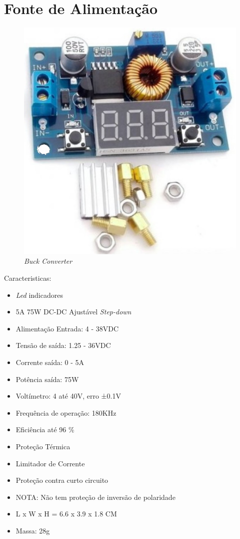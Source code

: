 \section{Fonte de Alimentação}
\begin{minipage}[!b]{.5\linewidth}
	\begin{figure}[H]
		\captionsetup{justification=raggedright,singlelinecheck=false}
		\flushleft
		\includegraphics[scale=0.5]{./image/PESTA/material/DCDC_converter.jpg}
		\caption{\textit{Buck Converter}}
		\label{buck-converter}
	\end{figure}
\end{minipage}
\begin{minipage}[!b]{.5\linewidth}
\small
Caracteristicas:
	\begin{itemize}
		\setlength\itemsep{-0.5em}
		\footnotesize
		\item \textit{Led} indicadores
		\item 5A 75W DC-DC Ajustável \textit{Step-down}
		\item Alimentação Entrada: 4 - 38VDC
		\item Tensão de saída: 1.25 - 36VDC
		\item Corrente saída: 0 - 5A
		\item Potência saída: 75W
		\item Voltímetro: 4 até 40V, erro ±0.1V
		\item Frequência de operação: 180KHz
		\item Eficiência até 96 \%
		\item Proteção Térmica
		\item Limitador de Corrente
		\item Proteção contra curto circuito
		\item NOTA: Não tem proteção de inversão de polaridade
		\item L x W x H = 6.6 x 3.9 x 1.8 CM
		\item Massa: 28g
	\end{itemize}
\end{minipage}
